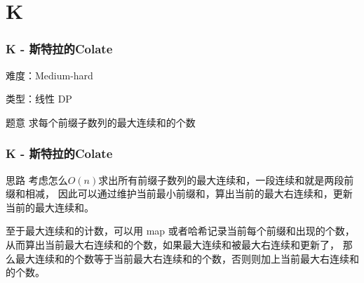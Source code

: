 \section{K}
\begin{frame}
\frametitle{K - 斯特拉的Colate}
难度：Medium-hard

类型：线性 DP

\begin{block}{题意}
求每个前缀子数列的最大连续和的个数
\end{block}

\end{frame}

\begin{frame}
\frametitle{K - 斯特拉的Colate}
\begin{block}{思路}
考虑怎么$ O(n) $求出所有前缀子数列的最大连续和，一段连续和就是两段前缀和相减，
因此可以通过维护当前最小前缀和，算出当前的最大右连续和，更新当前的最大连续和。

至于最大连续和的计数，可以用 map 或者哈希记录当前每个前缀和出现的个数，
从而算出当前最大右连续和的个数，如果最大连续和被最大右连续和更新了，
那么最大连续和的个数等于当前最大右连续和的个数，否则则加上当前最大右连续和的个数。
\end{block}
\end{frame}